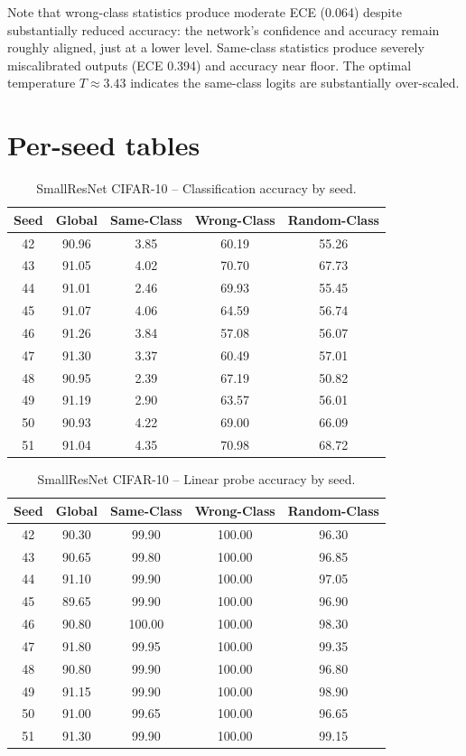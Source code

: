 \documentclass{article}
\begin{document}
Note that wrong-class statistics produce moderate ECE (0.064) despite substantially reduced accuracy: the network's confidence and accuracy remain roughly aligned, just at a lower level. Same-class statistics produce severely miscalibrated outputs (ECE 0.394) and accuracy near floor. The optimal temperature $T\approx 3.43$ indicates the same-class logits are substantially over-scaled.

\section{Per-seed tables}
\label{app:perseed}

\begin{table}[h]
\caption{SmallResNet CIFAR-10 -- Classification accuracy by seed.}
\label{tab:perseed_acc}
\centering
\small
\begin{tabular}{@{}ccccc@{}}
\toprule
Seed & Global & Same-Class & Wrong-Class & Random-Class \\
\midrule
42 & 90.96 & 3.85 & 60.19 & 55.26 \\
43 & 91.05 & 4.02 & 70.70 & 67.73 \\
44 & 91.01 & 2.46 & 69.93 & 55.45 \\
45 & 91.07 & 4.06 & 64.59 & 56.74 \\
46 & 91.26 & 3.84 & 57.08 & 56.07 \\
47 & 91.30 & 3.37 & 60.49 & 57.01 \\
48 & 90.95 & 2.39 & 67.19 & 50.82 \\
49 & 91.19 & 2.90 & 63.57 & 56.01 \\
50 & 90.93 & 4.22 & 69.00 & 66.09 \\
51 & 91.04 & 4.35 & 70.98 & 68.72 \\
\bottomrule
\end{tabular}
\end{table}

\begin{table}[h]
\caption{SmallResNet CIFAR-10 -- Linear probe accuracy by seed.}
\label{tab:perseed_probe}
\centering
\small
\begin{tabular}{@{}ccccc@{}}
\toprule
Seed & Global & Same-Class & Wrong-Class & Random-Class \\
\midrule
42 & 90.30 & 99.90  & 100.00 & 96.30 \\
43 & 90.65 & 99.80  & 100.00 & 96.85 \\
44 & 91.10 & 99.90  & 100.00 & 97.05 \\
45 & 89.65 & 99.90  & 100.00 & 96.90 \\
46 & 90.80 & 100.00 & 100.00 & 98.30 \\
47 & 91.80 & 99.95  & 100.00 & 99.35 \\
48 & 90.80 & 99.90  & 100.00 & 96.80 \\
49 & 91.15 & 99.90  & 100.00 & 98.90 \\
50 & 91.00 & 99.65  & 100.00 & 96.65 \\
51 & 91.30 & 99.90  & 100.00 & 99.15 \\
\bottomrule
\end{tabular}
\end{table}
\end{document}
